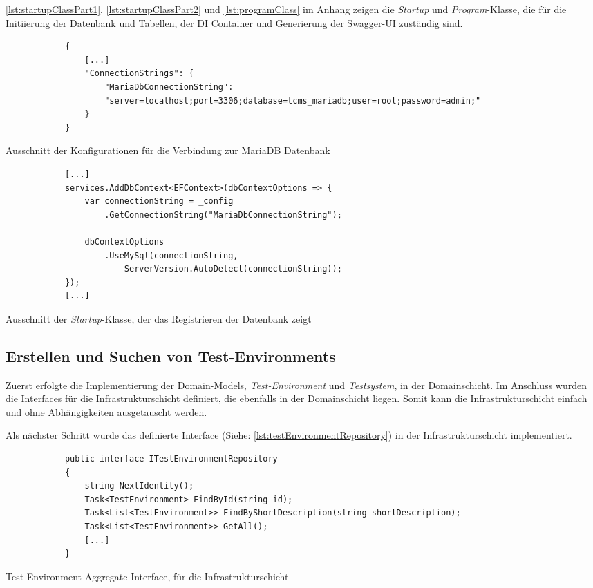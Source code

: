 \documentclass[a4paper, fontsize=11pt, parskip=half, twoside]{scrreprt}
\begin{document}
	\autoref{lst:startupClassPart1}, \ref{lst:startupClassPart2} und \ref{lst:programClass} im Anhang zeigen die \emph{Startup} und \emph{Program}-Klasse, die für die Initiierung der Datenbank und Tabellen, der \ac{DI} Container und Generierung der Swagger-UI zuständig sind.

	\begin{listing}[ht]
		\begin{verbatim}
			{
				[...]		
				"ConnectionStrings": {
					"MariaDbConnectionString": 
					"server=localhost;port=3306;database=tcms_mariadb;user=root;password=admin;"
				}
			}
		\end{verbatim}
		\caption{Ausschnitt der Konfigurationen für die Verbindung zur MariaDB Datenbank}
		\label{lst:connectionConfigs}
	\end{listing}

	\begin{listing}[ht]
		\begin{verbatim}
			[...]		
			services.AddDbContext<EFContext>(dbContextOptions => {
				var connectionString = _config
					.GetConnectionString("MariaDbConnectionString");
				
				dbContextOptions
					.UseMySql(connectionString,
						ServerVersion.AutoDetect(connectionString));
			});		
			[...]
		\end{verbatim}
		\caption{Ausschnitt der \emph{Startup}-Klasse, der das Registrieren der Datenbank zeigt}
		\label{lst:registerDatabase}
	\end{listing}

	\subsection{Erstellen und Suchen von Test-Environments} \label{subsec:createAndSearchTestEnvironments}
	Zuerst erfolgte die Implementierung der Domain-Models, \emph{Test-Environment} und \emph{Testsystem}, in der Domainschicht.
	Im Anschluss wurden die Interfaces für die Infrastrukturschicht definiert, die ebenfalls in der Domainschicht liegen.
	Somit kann die Infrastrukturschicht einfach und ohne Abhängigkeiten ausgetauscht werden.
	
	Als nächster Schritt wurde das definierte Interface (Siehe: \autoref{lst:testEnvironmentRepository}) in der Infrastrukturschicht implementiert.

	\begin{listing}[ht]
		\begin{verbatim}
			public interface ITestEnvironmentRepository
			{
				string NextIdentity();
				Task<TestEnvironment> FindById(string id);
				Task<List<TestEnvironment>> FindByShortDescription(string shortDescription);
				Task<List<TestEnvironment>> GetAll();
				[...]
			}
		\end{verbatim}
		\caption{Test-Environment Aggregate Interface, für die Infrastrukturschicht}
		\label{lst:testEnvironmentRepository}
	\end{listing}
\end{document}
